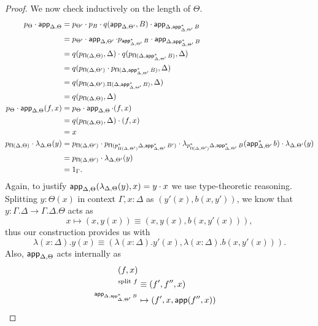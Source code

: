 \begin{proof}
  We now check inductively on the length of $\Theta$.
  \begin{align*}
    p_{\Theta}\cdot\operatorname{\mathsf{app}}_{\Delta,\Theta}
    &=p_{\Theta'}\cdot
    p_B\cdot
    q(\operatorname{\mathsf{app}}_{\Delta,\Theta'},B)\cdot
    \operatorname{\mathsf{app}}_{\Delta,\operatorname{\mathsf{app}}^*_{\Delta,\Theta'}B} \\
    &=p_{\Theta'}\cdot
    \operatorname{\mathsf{app}}_{\Delta,\Theta'}\cdot
    p_{\operatorname{\mathsf{app}}^*_{\Delta,\Theta'}B}\cdot
    \operatorname{\mathsf{app}}_{\Delta,\operatorname{\mathsf{app}}^*_{\Delta,\Theta'}B} \\
    &=q(p_{\operatorname{\mathsf{\Pi}}(\Delta,\Theta)},\Delta)\cdot
    q(p_{\operatorname{\mathsf{\Pi}}(\Delta,\operatorname{\mathsf{app}}^*_{\Delta,\Theta'}B)},\Delta) \\
    &=q(p_{\operatorname{\mathsf{\Pi}}(\Delta,\Theta')}\cdot
    p_{\operatorname{\mathsf{\Pi}}(\Delta,\operatorname{\mathsf{app}}^*_{\Delta,\Theta'}B)},\Delta) \\
    &=q(p_{\operatorname{\mathsf{\Pi}}(\Delta,\Theta').\Pi(\Delta,\operatorname{\mathsf{app}}^*_{\Delta,\Theta'}B)},\Delta) \\
    &=q(p_{\operatorname{\mathsf{\Pi}}(\Delta,\Theta)},\Delta) \\
    p_\Theta\cdot\operatorname{\mathsf{app}}_{\Delta,\Theta}(f,x)
    &=p_\Theta\cdot\operatorname{\mathsf{app}}_{\Delta,\Theta}\cdot(f,x) \\
    &=q(p_{\operatorname{\mathsf{\Pi}}(\Delta,\Theta)},\Delta)\cdot(f,x) \\
    &=x \\
    p_{\operatorname{\mathsf{\Pi}}(\Delta,\Theta)}\cdot
    \lambda_{\Delta,\Theta}(y)
    &=p_{\operatorname{\mathsf{\Pi}}(\Delta,\Theta')}\cdot
    p_{\operatorname{\mathsf{\Pi}}(p_{\Pi(\Delta,\Theta')}^*\Delta,\operatorname{\mathsf{app}}^*_{\Delta,\Theta'}B')}\cdot
    \lambda_{p^*_{\operatorname{\mathsf{\Pi}}(\Delta,\Theta')}\Delta,\operatorname{\mathsf{app}}^*_{\Delta,\Theta'}B}(\operatorname{\mathsf{app}}_{\Delta,\Theta'}^*b)\cdot
    \lambda_{\Delta,\Theta'}(y) \\
    &=p_{\operatorname{\mathsf{\Pi}}(\Delta,\Theta')}\cdot
    \lambda_{\Delta,\Theta'}(y) \\
    &=1_\Gamma.
  \end{align*}
  Again, to justify
  $\operatorname{\mathsf{app}}_{\Delta,\Theta}(\lambda_{\Delta,\Theta}(y),x)=y\cdot x$ we use
  type-theoretic reasoning.
  Splitting $y:\Theta(x)$ in context $\Gamma,x:\Delta$ as $(y'(x),b(x,y'))$, we
  know that $y\colon\Gamma.\Delta\rightarrow\Gamma.\Delta.\Theta$ acts as
  \[x\mapsto(x,y(x))\equiv(x,y(x),b(x,y'(x))),\]
  thus our construction provides us with
  \[\lambda(x:\Delta).y(x)\equiv
  (\lambda(x:\Delta).y'(x),\lambda(x:\Delta).b(x,y'(x))).\]
  Also, $\operatorname{\mathsf{app}}_{\Delta,\Theta}$ acts internally as
  \begin{align*}
    (f,x) \\
    ^{\text{split }f}&\equiv(f',f'',x) \\
    ^{\app_{\Delta,\app^*_{\Delta,\Theta'}B}}&\mapsto(f',x,\app(f'',x)) \\

\end{align*}
\end{proof}
